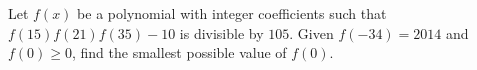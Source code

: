 Let $f(x)$ be a polynomial with integer coefficients such that $f(15) f(21) f(35) - 10$ is divisible by $105$. Given $f(-34) = 2014$ and $f(0) \ge 0$, find the smallest possible value of $f(0)$.
